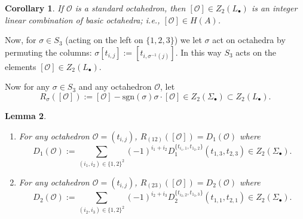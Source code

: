 \documentclass[12pt]{amsart}
\newtheorem{lem}{Lemma}[section]
\newtheorem{cor}[lem]{Corollary}
\theoremstyle{definition}
\newcommand{\oct}{\mathcal{O}}%
\newcommand{\cyc}[1]{\left[ #1\right]} %
\newcommand{\<}{\langle}
\renewcommand{\>}{\rangle}
\begin{document}
\begin{cor} 
 If $\oct$ is a standard octahedron, then $\cyc{\oct}\in Z_2(L_\bullet)$ is an integer linear combination of basic octahedra; i.e., $\cyc{\oct}\in H(A)$.
\end{cor}


Now, for $\sigma\in S_3$ (acting on the left on $\{ 1,2,3\}$) we let $\sigma$ act on octahedra by permuting the columns: $\sigma\cyc{ t_{i,j}}:= \cyc{ t_{i,\sigma^{-1}(j)}}$. In this way $S_3$ 
acts on the elements $\cyc{\oct}\in Z_2(L_\bullet)$. 

Now for any $\sigma\in S_3$ and any octahedron $\oct$, let 
\[
R_\sigma(\cyc{\oct}):= \cyc{\oct}-\mathrm{sgn}(\sigma)\sigma\cdot \cyc{\oct}\in Z_2(\Sigma_\bullet)\subset Z_2(L_\bullet).
\]

\begin{lem}\label{lem:oct2} 
\begin{enumerate}

\item For any octahedron $\oct=(t_{i,j})$, $R_{(12)}(\cyc{\oct})=D_1(\oct)$ where 
\[
D_1(\oct):= \sum_{(i_1,i_2)\in \{ 1,2\}^2}(-1)^{i_1+i_2}D_1^{\{ t_{i_1,1},t_{1_2,2}\}}(t_{1,3},t_{2,3})\in Z_2(\Sigma_\bullet).
\]
\item For any octahedron $\oct=(t_{i,j})$, $R_{(23)}(\cyc{\oct})=D_2(\oct)$ where 
\[
D_2(\oct):= \sum_{(i_2,i_3)\in \{ 1,2\}^2}(-1)^{i_2+i_3}D_2^{\{ t_{i_2,2},t_{1_3,3}\}}(t_{1,1},t_{2,1})\in Z_2(\Sigma_\bullet).
\]
\end{enumerate}
\end{lem}
\end{document}
